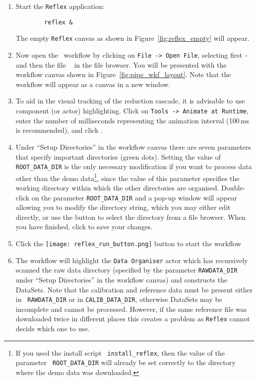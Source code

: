 \begin{enumerate}
  \item Start the {\tt Reflex} application:
        \begin{verbatim}
        reflex &
        \end{verbatim}
        The empty {\tt Reflex} canvas as shown in Figure~\ref{fig:reflex_empty}
        will appear.

  \item Now open the \instname\, workflow by clicking on {\tt File -> Open
    File}, selecting first {\tt \pipename-\pipelinevers} and then the file {\tt
    \wkffilename} in the file browser.  You will be presented with the
    workflow canvas shown in Figure~\ref{fig:pipe_wkf_layout}. Note that
    the workflow will appear as a canvas in a new window.

  \item To aid in the visual tracking of the reduction cascade, it is advisable
  to use component (or actor) highlighting. Click on {\tt Tools -> Animate at
  Runtime}, enter the number of milliseconds representing the animation
  interval (100\,ms is recommended), and click .

  \item Under ``Setup Directories'' in the workflow canvas there are
    seven parameters that specify important directories (green
    dots). Setting the value of {\tt ROOT\_DATA\_DIR} is the only
    necessary modification if you want to process data other than the
    demo data\footnote{If you used the install script {\tt
        install\_reflex}, then the value of the parameter {\tt
        ROOT\_DATA\_DIR} will already be set correctly to the
      directory where the demo data was downloaded.}, since
    the value of this parameter specifies the working directory within
    which the other directories are organised. Double-click on the
    parameter {\tt ROOT\_DATA\_DIR} and a pop-up window will appear
    allowing you to modify the directory string, which you may either
    edit directly, or use the  button to select the
    directory from a file browser.  When you have finished, click
     to save your changes.

  \item Click the 
  \texttt{[image: reflex\_run\_button.png]}
  button to start the workflow

  \item The workflow will highlight the {\tt Data Organiser} actor
    which has recursively scanned the raw data directory (specified by the
    parameter {\tt RAWDATA\_DIR} under ``Setup Directories'' in the
    workflow canvas) and constructs the DataSets. Note that the
    calibration and reference data must be present either in {\tt
      RAWDATA\_DIR} or in {\tt CALIB\_DATA\_DIR}, otherwise DataSets
    may be incomplete and cannot be processed. However, if the same
    reference file was downloaded twice in different places this
    creates a problem as {\tt Reflex} cannot decide which one to use.


\end{enumerate}
